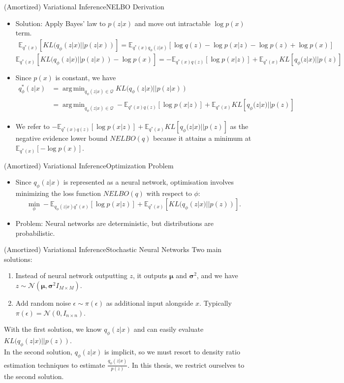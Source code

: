 \documentclass{beamer}
\newcommand{\E}{\mathbb{E}}
\DeclareMathOperator*{\argmin}{arg\,min}
\begin{document}
\begin{frame}{(Amortized) Variational Inference}{NELBO Derivation}
\begin{itemize}
\item Solution: Apply Bayes' law to $p(z|x)$ and move out intractable $\log p(x)$ term.
\footnotesize
\begin{align*}
\E_{q^*(x)}[KL(q_\phi(z|x)||p(z|x))]=\mathbb{E}_{q^*(x)q_\phi(z|x)}[\log q(z)-\log p(x|z)-\log p(z)+\log p(x)]
\end{align*}
\[\E_{q^*(x)}[KL(q_\phi(z|x)||p(z|x))-\log p(x)]=-\mathbb{E}_{q^*(x)q(z)}[\log p(x|z)]+\E_{q^*(x)}KL[q_\phi(z|x)||p(z)]\]
\normalsize
\item Since $p(x)$ is constant, we have
\begin{align*}
q^*_\phi(z|x)&=\argmin_{q_\phi(z|x)\in\mathcal{Q}}KL(q_\phi(z|x)||p(z|x))\\
&=\argmin_{q_\phi(z|x)\in\mathcal{Q}}-\mathbb{E}_{q^*(x)q(z)}[\log p(x|z)]+\E_{q^*(x)}KL[q_\phi(z|x)||p(z)]
\end{align*}
\item We refer to $-\mathbb{E}_{q^*(x)q(z)}[\log p(x|z)]+\E_{q^*(x)}KL[q_\phi(z|x)||p(z)]$ as the negative evidence lower bound $NELBO(q)$ because it attains a minimum at $\E_{q^*(x)}[-\log p(x)]$.
\end{itemize}
\end{frame}
\begin{frame}{(Amortized) Variational Inference}{Optimization Problem}
\begin{itemize}
\item Since $q_\phi(z|x)$ is represented as a neural network, optimisation involves minimizing the loss function $NELBO(q)$ with respect to $\phi$:
\[\min_\phi -\mathbb{E}_{q_\phi(z|x)q^*(x)}[\log p(x|z)]+\mathbb{E}_{q^*(x)}[KL(q_\phi(z|x)||p(z))].\]
\item Problem: Neural networks are deterministic, but distributions are probabilistic.
\end{itemize}
\end{frame}
\begin{frame}{(Amortized) Variational Inference}{Stochastic Neural Networks}
Two main solutions:
\begin{enumerate}
\item Instead of neural network outputting $z$, it outputs $\bm{\mu}$ and $\bm{\sigma}^2$, and we have $z\sim \mathcal{N}(\bm{\mu},\bm{\sigma}^2I_{M\times M})$.
\item Add random noise $\epsilon \sim \pi(\epsilon)$ as additional input alongside $x$. Typically $\pi(\epsilon)=\mathcal{N}(0,I_{n\times n})$.
\end{enumerate}
With the first solution, we know $q_\phi(z|x)$ and can easily evaluate $KL(q_\phi(z|x)||p(z))$.\\
In the second solution, $q_\phi(z|x)$ is implicit, so we must resort to density ratio estimation techniques to estimate $\frac{q_\phi(z|x)}{p(z)}$. In this thesis, we restrict ourselves to the second solution.
\end{frame}
\end{document}
